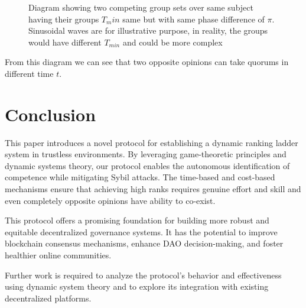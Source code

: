 \documentclass{article}
\begin{document}
\begin{CJK}{UTF8}{gbsn}
\begin{figure}[ht]
\begin{tikzpicture}
        \end{tikzpicture}
        \caption{Diagram showing two competing group sets over same subject having their groups $T_min$ same but with same phase difference of $\pi$. Sinusoidal waves are for illustrative purpose, in reality, the groups would have different $T_{min}$ and could be more complex
            \label{fig:processes-sinusoidal}}
    \end{figure}

    From this diagram we can see that two opposite opinions can take quorums in different time $t$.

    \section{Conclusion}

    This paper introduces a novel protocol for establishing a dynamic ranking ladder system in trustless environments. By leveraging game-theoretic principles and dynamic systems theory, our protocol enables the autonomous identification of competence while mitigating Sybil attacks. The time-based and cost-based mechanisms ensure that achieving high ranks requires genuine effort and skill and even completely opposite opinions have ability to co-exist.

    This protocol offers a promising foundation for building more robust and equitable decentralized governance systems. It has the potential to improve blockchain consensus mechanisms, enhance DAO decision-making, and foster healthier online communities.

    Further work is required to analyze the protocol's behavior and effectiveness using dynamic system theory and to explore its integration with existing decentralized platforms.






    \clearpage

    
    

    \clearpage\end{CJK}
\end{document}
